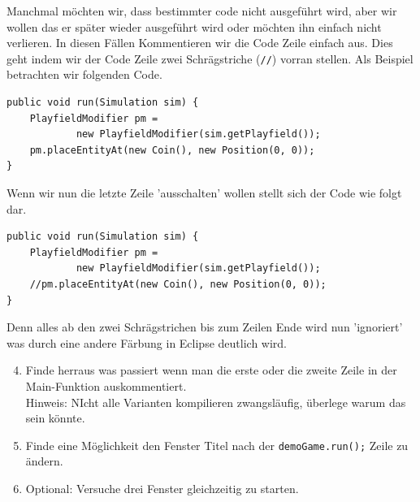 \begin{Infobox}
    Manchmal möchten wir, dass bestimmter code nicht ausgeführt wird, aber wir wollen das er später wieder ausgeführt wird oder möchten ihn einfach nicht verlieren.
    In diesen Fällen Kommentieren wir die Code Zeile einfach aus.
    Dies geht indem wir der Code Zeile zwei Schrägstriche ({\color{javagreen}\texttt{//}}) vorran stellen.
    Als Beispiel betrachten wir folgenden Code.\\

    \hfill
    \begin{minipage}{.96\textwidth}
        \begin{lstlisting}
public void run(Simulation sim) {
    PlayfieldModifier pm =
            new PlayfieldModifier(sim.getPlayfield());
    pm.placeEntityAt(new Coin(), new Position(0, 0));
}
        \end{lstlisting}
    \end{minipage}

    Wenn wir nun die letzte Zeile 'ausschalten' wollen stellt sich der Code wie folgt dar.\\

    \hfill
    \begin{minipage}{.96\textwidth}
        \begin{lstlisting}
public void run(Simulation sim) {
    PlayfieldModifier pm =
            new PlayfieldModifier(sim.getPlayfield());
    //pm.placeEntityAt(new Coin(), new Position(0, 0));
}
        \end{lstlisting}
    \end{minipage}

    Denn alles ab den zwei Schrägstrichen bis zum Zeilen Ende wird nun 'ignoriert' was durch eine andere Färbung in Eclipse deutlich wird.
\end{Infobox}

\begin{enumerate}[label=\alph*)] \setcounter{enumi}{3}
    \item Finde herraus was passiert wenn man die erste oder die zweite Zeile in der Main-Funktion auskommentiert.\\
    Hinweis: NIcht alle Varianten kompilieren zwangsläufig, überlege warum das sein könnte.
    \item Finde eine Möglichkeit den Fenster Titel nach der \texttt{demoGame.run();} Zeile zu ändern.
    \item Optional: Versuche drei Fenster gleichzeitig zu starten.
\end{enumerate}
